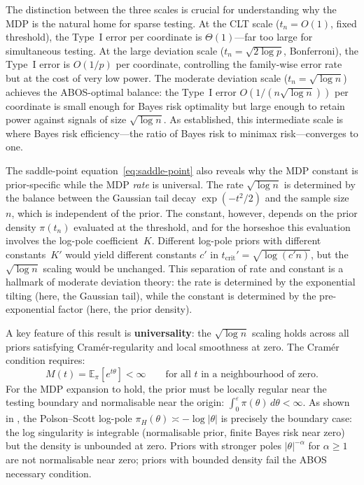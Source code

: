 \documentclass[12pt]{article}
\newcommand{\E}{\mathbb{E}}
\newcommand{\abs}[1]{\lvert #1 \rvert}
\newcommand{\piH}{\pi_H}
\newcommand{\tcrit}{t_{\mathrm{crit}}}
\begin{document}
The distinction between the three scales is crucial for understanding why the MDP is the natural home for sparse testing. At the CLT scale ($t_n = O(1)$, fixed threshold), the Type~I error per coordinate is $\Theta(1)$---far too large for simultaneous testing. At the large deviation scale ($t_n = \sqrt{2\log p}$, Bonferroni), the Type~I error is $O(1/p)$ per coordinate, controlling the family-wise error rate but at the cost of very low power. The moderate deviation scale ($t_n = \sqrt{\log n}$) achieves the ABOS-optimal balance: the Type~I error $O(1/(n\sqrt{\log n}))$ per coordinate is small enough for Bayes risk optimality but large enough to retain power against signals of size $\sqrt{\log n}$. As \citet{rubin1965bayes} established, this intermediate scale is where Bayes risk efficiency---the ratio of Bayes risk to minimax risk---converges to one.

The saddle-point equation~\eqref{eq:saddle-point} also reveals why the MDP constant is prior-specific while the MDP \emph{rate} is universal. The rate $\sqrt{\log n}$ is determined by the balance between the Gaussian tail decay $\exp(-t^2/2)$ and the sample size~$n$, which is independent of the prior. The constant, however, depends on the prior density $\pi(t_n)$ evaluated at the threshold, and for the horseshoe this evaluation involves the log-pole coefficient~$K$. Different log-pole priors with different constants~$K'$ would yield different constants $c'$ in $\tcrit' = \sqrt{\log(c' n)}$, but the $\sqrt{\log n}$ scaling would be unchanged. This separation of rate and constant is a hallmark of moderate deviation theory: the rate is determined by the exponential tilting (here, the Gaussian tail), while the constant is determined by the pre-exponential factor (here, the prior density).

A key feature of this result is \textbf{universality}: the $\sqrt{\log n}$ scaling holds across all priors satisfying Cram\'er-regularity and local smoothness at zero. The Cram\'er condition requires:
\begin{equation}\label{eq:cramer}
  M(t) = \E_\pi[e^{t\theta}] < \infty
  \qquad\text{for all } t \text{ in a neighbourhood of zero.}
\end{equation}
For the MDP expansion to hold, the prior must be locally regular near the testing boundary and normalisable near the origin: $\int_0^\varepsilon \pi(\theta)\, d\theta < \infty$. As shown in , the Polson--Scott log-pole $\piH(\theta) \asymp -\log\abs{\theta}$ is precisely the boundary case: the log singularity is integrable (normalisable prior, finite Bayes risk near zero) but the density is unbounded at zero. Priors with stronger poles $\abs{\theta}^{-\alpha}$ for $\alpha \geq 1$ are not normalisable near zero; priors with bounded density fail the ABOS necessary condition.
\end{document}
